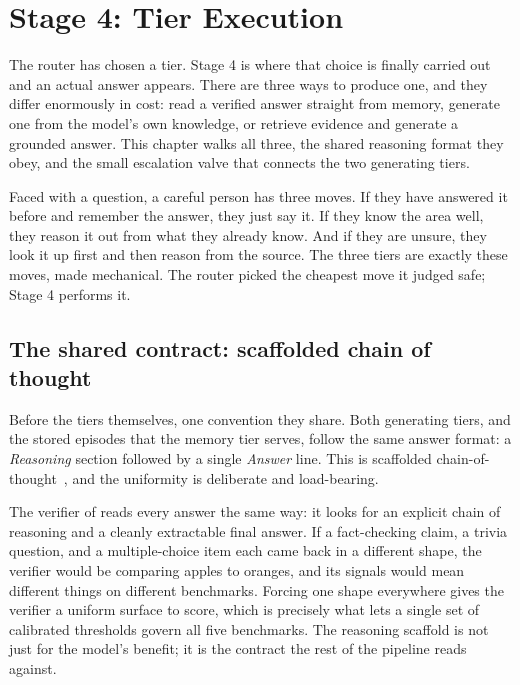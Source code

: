 \chapter{Stage 4: Tier Execution}
\label{ch:tiers}

The router has chosen a tier. Stage 4 is where that choice is finally carried out
and an actual answer appears. There are three ways to produce one, and they differ
enormously in cost: read a verified answer straight from memory, generate one from
the model's own knowledge, or retrieve evidence and generate a grounded answer.
This chapter walks all three, the shared reasoning format they obey, and the small
escalation valve that connects the two generating tiers.

\begin{intuition}
Faced with a question, a careful person has three moves. If they have answered it
before and remember the answer, they just say it. If they know the area well, they
reason it out from what they already know. And if they are unsure, they look it up
first and then reason from the source. The three tiers are exactly these moves,
made mechanical. The router picked the cheapest move it judged safe; Stage 4
performs it.
\end{intuition}

\section{The shared contract: scaffolded chain of thought}
\label{sec:tiers-contract}

Before the tiers themselves, one convention they share. Both generating tiers, and
the stored episodes that the memory tier serves, follow the same answer format: a
\emph{Reasoning} section followed by a single \emph{Answer} line. This is scaffolded
chain-of-thought~\cite{wei2022chain}, and the uniformity is deliberate and
load-bearing.

\begin{intuition}
The verifier of  reads every answer the same way: it looks for an
explicit chain of reasoning and a cleanly extractable final answer. If a fact-checking
claim, a trivia question, and a multiple-choice item each came back in a different
shape, the verifier would be comparing apples to oranges, and its signals would mean
different things on different benchmarks. Forcing one shape everywhere gives the
verifier a uniform surface to score, which is precisely what lets a single set of
calibrated thresholds govern all five benchmarks. The reasoning scaffold is not just
for the model's benefit; it is the contract the rest of the pipeline reads against.
\end{intuition}

